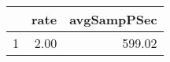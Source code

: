 \begin{table}[h]
\centering
\begingroup\tiny
\begin{tabular}{rrr}
  \hline
 & rate & avgSampPSec \\ 
  \hline
1 & 2.00 & 599.02 \\ 
   \hline
\end{tabular}
\endgroup
\end{table}
